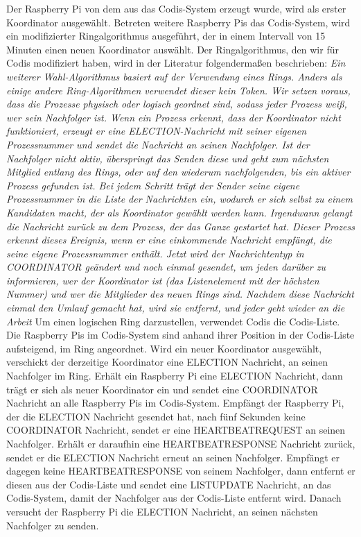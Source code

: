 \documentclass[journal]{IEEEtran}
\begin{document}
Der Raspberry Pi von dem aus das Codis-System erzeugt wurde, wird als erster Koordinator ausgewählt. Betreten weitere Raspberry Pis das Codis-System, wird ein modifizierter Ringalgorithmus\cite{verteilte1}\cite{verteilte2} ausgeführt, der in einem Intervall von 15 Minuten einen neuen Koordinator auswählt. Der Ringalgorithmus, den wir für Codis modifiziert haben, wird in der Literatur folgendermaßen beschrieben: \textit{Ein weiterer Wahl-Algorithmus basiert auf der Verwendung eines Rings. Anders als einige andere Ring-Algorithmen verwendet dieser kein Token. Wir setzen voraus, dass die Prozesse physisch oder logisch geordnet sind, sodass jeder Prozess weiß, wer sein Nachfolger ist. Wenn ein Prozess erkennt, dass der Koordinator nicht funktioniert, erzeugt er eine ELECTION-Nachricht mit seiner eigenen Prozessnummer und sendet die Nachricht an seinen Nachfolger. Ist der Nachfolger nicht aktiv, überspringt das Senden diese und geht zum nächsten Mitglied entlang des Rings, oder auf den wiederum nachfolgenden, bis ein aktiver Prozess gefunden ist. Bei jedem Schritt trägt der Sender seine eigene Prozessnummer in die Liste der Nachrichten ein, wodurch er sich selbst zu einem Kandidaten macht, der als Koordinator gewählt werden kann. Irgendwann gelangt die Nachricht zurück zu dem Prozess, der das Ganze gestartet hat. Dieser Prozess erkennt dieses Ereignis, wenn er eine einkommende Nachricht empfängt, die seine eigene Prozessnummer enthält. Jetzt wird der Nachrichtentyp in COORDINATOR geändert und noch einmal gesendet, um jeden darüber zu informieren, wer der Koordinator ist (das Listenelement mit der höchsten Nummer) und wer die Mitglieder des neuen Rings sind. Nachdem diese Nachricht einmal den Umlauf gemacht hat, wird sie entfernt, und jeder geht wieder an die Arbeit}\cite[S. 300]{verteilte1} Um einen logischen Ring darzustellen, verwendet Codis die Codis-Liste. Die Raspberry Pis im Codis-System sind anhand ihrer Position in der Codis-Liste aufsteigend, im Ring angeordnet. Wird ein neuer Koordinator ausgewählt, verschickt der derzeitige Koordinator eine \MakeUppercase{election} Nachricht, an seinen Nachfolger im Ring. Erhält ein Raspberry Pi eine \MakeUppercase{election} Nachricht, dann trägt er sich als neuer Koordinator ein und sendet eine \MakeUppercase{coordinator} Nachricht an alle Raspberry Pis im Codis-System. Empfängt der Raspberry Pi, der die \MakeUppercase{election} Nachricht gesendet hat, nach fünf Sekunden keine \MakeUppercase{coordinator} Nachricht, sendet er eine \MakeUppercase{heartbeatrequest} an seinen Nachfolger. Erhält er daraufhin eine \MakeUppercase{heartbeatresponse} Nachricht zurück, sendet er die \MakeUppercase{election} Nachricht erneut an seinen Nachfolger. Empfängt er dagegen keine \MakeUppercase{heartbeatresponse} von seinem Nachfolger, dann entfernt er diesen aus der Codis-Liste und sendet eine \MakeUppercase{listupdate} Nachricht, an das Codis-System, damit der Nachfolger aus der Codis-Liste entfernt wird. Danach versucht der Raspberry Pi die \MakeUppercase{election} Nachricht, an seinen nächsten Nachfolger zu senden.
\end{document}
